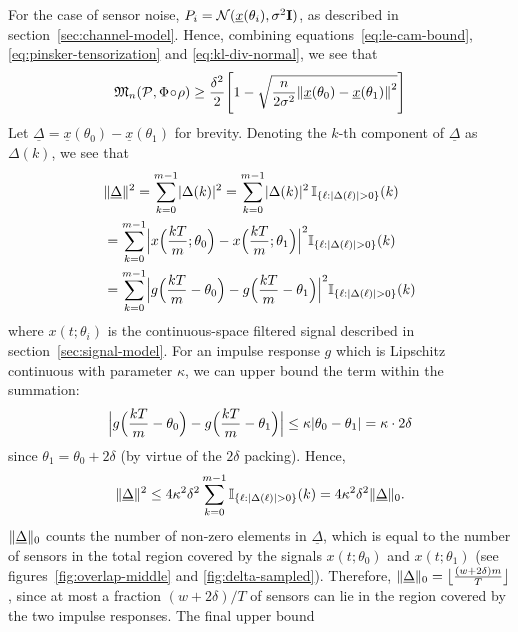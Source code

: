 \documentclass[conference]{IEEEtran}
\providecommand{\v}{}
\renewcommand{\v}[1]{\underline{#1}}
\providecommand{\m}{}
\renewcommand{\m}[1]{{\bf #1}}
\DeclarePairedDelimiter\abs{\lvert}{\rvert}
\DeclarePairedDelimiter\norm{\lVert}{\rVert}
\DeclarePairedDelimiter\floor{\lfloor}{\rfloor}
\newcommand{\Phiorho}{\Phi\!\circ\!\rho}
\begin{document}
\begin{IEEEproof}
For the case of sensor noise, $P_i = \mathcal{N}(\v x(\theta_i), \sigma^2 \m
I)$, as described in section~\ref{sec:channel-model}. Hence, combining
equations~\eqref{eq:le-cam-bound}, \eqref{eq:pinsker-tensorization} and
\eqref{eq:kl-div-normal}, we see that
\begin{equation} \label{eq:lb-after-pinsker}
	\mathfrak{M}_n(\mathcal{P}, \Phiorho) \geq \frac{\delta^2}{2} \Bigg[ 1 - \sqrt{ \frac{n}{2\sigma^2} \norm*{\v x(\theta_0) - \v x(\theta_1)}^2 } \Bigg]
\end{equation}
Let $\v \Delta = \v x(\theta_0) - \v x(\theta_1)$ for brevity. Denoting the
$k$-th component of $\v\Delta$ as $\Delta(k)$, we see that
\begin{align}
	&\norm{\v\Delta}^2 = \sum_{k=0}^{m-1} \abs{\Delta(k)}^2 = \sum_{k=0}^{m-1} \abs{\Delta(k)}^2 \, \mathbb I_{\{\ell: \abs{\Delta(\ell)} > 0\}}(k) \\
	&= \sum_{k=0}^{m-1} \abs[\Big]{x\Big(\frac{kT}{m}; \theta_0\Big) - x\Big(\frac{kT}{m}; \theta_1\Big)}^2 \mathbb I_{\{\ell: \abs{\Delta(\ell)} > 0\}}(k) \\
	&= \sum_{k=0}^{m-1} \abs[\Big]{g\Big(\frac{kT}{m} - \theta_0\Big) - g\Big(\frac{kT}{m} - \theta_1\Big)}^2 \mathbb I_{\{\ell: \abs{\Delta(\ell)} > 0\}}(k)
\end{align}
where $x(t;\theta_i)$ is the continuous-space filtered signal described in
section~\ref{sec:signal-model}. For an impulse response $g$ which is Lipschitz
continuous with parameter $\kappa$, we can upper bound the term within the
summation:
\begin{equation}
	\abs[\Big]{g\Big(\frac{kT}{m} - \theta_0\Big) - g\Big(\frac{kT}{m} - \theta_1\Big)} \leq \kappa \abs{\theta_0 - \theta_1} = \kappa \cdot 2\delta
\end{equation}
since $\theta_1 = \theta_0 + 2\delta$ (by virtue of the $2\delta$ packing).
Hence,
\begin{equation}
	\norm{\v\Delta}^2 \leq 4 \kappa^2 \delta^2 \sum_{k=0}^{m-1} \mathbb I_{\{\ell: \abs{\Delta(\ell)} > 0\}}(k) = 4 \kappa^2 \delta^2 \norm{\v\Delta}_0.
\end{equation}
$\norm{\v\Delta}_0$ counts the number of non-zero elements in $\v\Delta$, which
is equal to the number of sensors in the total region covered by the signals
$x(t;\theta_0)$ and $x(t;\theta_1)$ (see figures~\ref{fig:overlap-middle} and
\ref{fig:delta-sampled}). Therefore, $\norm{\v\Delta}_0 = \floor[\big]{\frac{(w
+ 2\delta)m}{T}}$, since at most a fraction $(w + 2\delta) / T$ of sensors can
lie in the region covered by the two impulse responses. The final upper bound

\end{IEEEproof}
\end{document}
